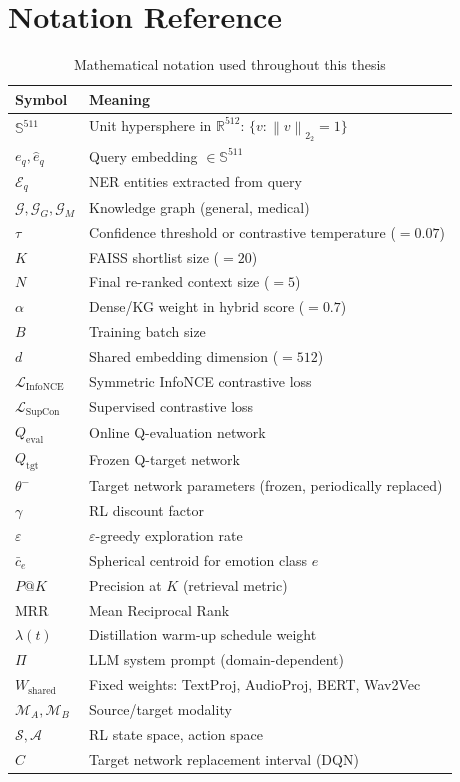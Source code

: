 \documentclass[12pt,a4paper]{article}
\theoremstyle{definition}
\theoremstyle{plain}
\theoremstyle{remark}
\newcommand{\R}{\mathbb{R}}
\newcommand{\Sph}{\mathbb{S}}
\newcommand{\Norm}[1]{\left\|#1\right\|_2}
\newcommand{\Loss}{\mathcal{L}}
\newcommand{\KG}{\mathcal{G}}
\newcommand{\Qeval}{Q_{\text{eval}}}
\newcommand{\Qtgt}{Q_{\text{tgt}}}
\begin{document}
\section{Notation Reference}

\begin{table}[H]
\centering
\caption{Mathematical notation used throughout this thesis}
\begin{tabular}{ll}
\toprule
\textbf{Symbol} & \textbf{Meaning} \\
\midrule
$\Sph^{511}$ & Unit hypersphere in $\R^{512}$: $\{v : \Norm{v}_2 = 1\}$ \\
$e_q, \hat{e}_q$ & Query embedding $\in \Sph^{511}$ \\
$\mathcal{E}_q$ & NER entities extracted from query \\
$\KG, \KG_G, \KG_M$ & Knowledge graph (general, medical) \\
$\tau$ & Confidence threshold or contrastive temperature ($= 0.07$) \\
$K$ & FAISS shortlist size ($= 20$) \\
$N$ & Final re-ranked context size ($= 5$) \\
$\alpha$ & Dense/KG weight in hybrid score ($= 0.7$) \\
$B$ & Training batch size \\
$d$ & Shared embedding dimension ($= 512$) \\
$\Loss_{\text{InfoNCE}}$ & Symmetric InfoNCE contrastive loss \\
$\Loss_{\text{SupCon}}$ & Supervised contrastive loss \\
$\Qeval$ & Online Q-evaluation network \\
$\Qtgt$ & Frozen Q-target network \\
$\theta^-$ & Target network parameters (frozen, periodically replaced) \\
$\gamma$ & RL discount factor \\
$\varepsilon$ & $\varepsilon$-greedy exploration rate \\
$\bar{c}_e$ & Spherical centroid for emotion class $e$ \\
$P@K$ & Precision at $K$ (retrieval metric) \\
$\text{MRR}$ & Mean Reciprocal Rank \\
$\lambda(t)$ & Distillation warm-up schedule weight \\
$\Pi$ & LLM system prompt (domain-dependent) \\
$W_{\text{shared}}$ & Fixed weights: TextProj, AudioProj, BERT, Wav2Vec \\
$\mathcal{M}_A, \mathcal{M}_B$ & Source/target modality \\
$\mathcal{S}, \mathcal{A}$ & RL state space, action space \\
$C$ & Target network replacement interval (DQN) \\
\bottomrule
\end{tabular}
\end{table}
\end{document}
